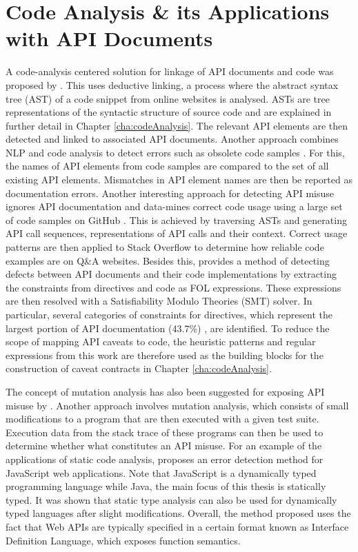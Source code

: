 \section{Code Analysis \& its Applications with API Documents}
\label{sec:related-static-code-analysis}
A code-analysis centered solution for linkage of API documents and code was proposed by \cite{live-api-doc}. This uses deductive linking, a process where the abstract syntax tree (AST) of a code snippet from online websites is analysed. ASTs are tree representations of the syntactic structure of source code and are explained in further detail in Chapter \ref{cha:codeAnalysis}. The relevant API elements are then detected and linked to associated API documents. Another approach combines NLP and code analysis to detect errors such as obsolete code samples \cite{zhong2013detecting}. For this, the names of API elements from code samples are compared to the set of all existing API elements. Mismatches in API element names are then be reported as documentation errors. Another interesting approach for detecting API misuse ignores API documentation and data-mines correct code usage using a large set of code samples on GitHub \cite{code-examples}. This is achieved by traversing ASTs and generating API call sequences, representations of API calls and their context. Correct usage patterns are then applied to Stack Overflow to determine how reliable code examples are on Q\&A websites. Besides this, \cite{zhou-directive} provides a method of detecting defects between API documents and their code implementations by extracting the constraints from directives and code as FOL expressions. These expressions are then resolved with a Satisfiability Modulo Theories (SMT) solver. In particular, several categories of constraints for directives, which represent the largest portion of API documentation (43.7\%) \cite{monperrus2012should}, are identified. To reduce the scope of mapping API caveats to code, the heuristic patterns and regular expressions from this work are therefore used as the building blocks for the construction of caveat contracts in Chapter \ref{cha:codeAnalysis}. \bigbreak

The concept of mutation analysis has also been suggested for exposing API misuse by \cite{mutation-analysis}. Another approach involves mutation analysis, which consists of small modifications to a program that are then executed with a given test suite. Execution data from the stack trace of these programs can then be used to determine whether what constitutes an API misuse. For an example of the applications of static code analysis, \cite{bae2014safewapi} proposes an error detection method for JavaScript web applications. Note that JavaScript is a dynamically typed programming language while Java, the main focus of this thesis is statically typed. It was shown that static type analysis can also be used for dynamically typed languages after slight modifications. Overall, the method proposed uses the fact that Web APIs are typically specified in a certain format known as Interface Definition Language, which exposes function semantics.

